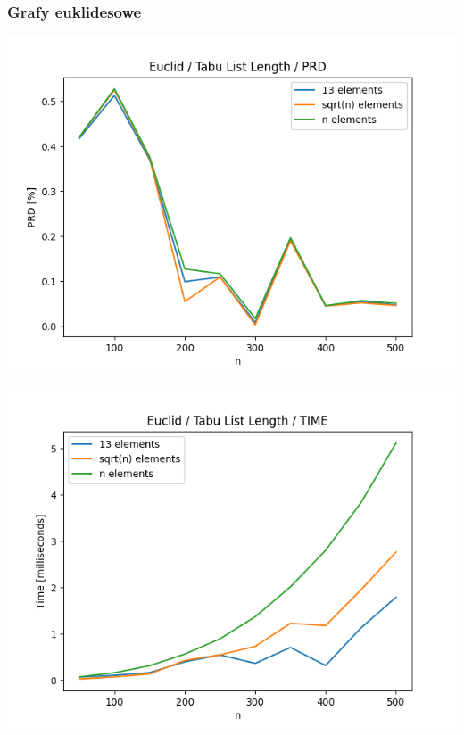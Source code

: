 \documentclass{article}
\begin{document}
\subsubsection{Grafy euklidesowe}

\begin{center}
\includegraphics[width=\textwidth, 
                   height = 0.4\textheight, 
                   keepaspectratio]
                  {plots/tabu_euclid_prd} 
\end{center}

\begin{center}
\includegraphics[width=\textwidth, 
                   height = 0.4\textheight, 
                   keepaspectratio]
                  {plots/tabu_euclid_time} 
\end{center}
\end{document}

